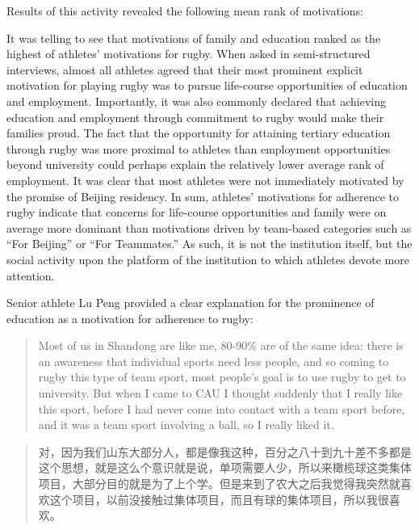 \begin{CJK}{UTF8}{gbsn}
Results of this activity revealed the following mean rank of motivations:

  


It was telling to see that motivations of family and education ranked as the highest of athletes' motivations for rugby.  When asked in semi-structured interviews, almost all athletes agreed that their most prominent explicit motivation for playing rugby was to pursue life-course opportunities of education and employment.  Importantly, it was also commonly declared that achieving education and employment through commitment to rugby would make their families proud.  The fact that the opportunity for attaining tertiary education through rugby was more proximal to athletes than employment opportunities beyond university could perhaps explain the relatively lower average rank of employment. It was clear that most athletes were not immediately motivated by the promise of Beijing residency.  In sum, athletes' motivations for adherence to rugby indicate that concerns for life-course opportunities and family were on average more dominant than motivations driven by team-based categories such as ``For Beijing'' or ``For Teammates.''  As such, it is not the institution itself, but the social activity upon the platform of the institution to which athletes devote more attention.

Senior athlete Lu Peng provided a clear explanation for the prominence of education as a motivation for adherence to rugby:

\begin{quotation}
  Most of us in Shandong are like me, 80-90\% are of the same idea: there is an awareness that individual sports need less people, and so coming to rugby this type of team sport, most people’s goal is to use rugby to get to university.  But when I came to CAU I thought suddenly that I really like this sport, before I had never come into contact with a team sport before, and it was a team sport involving a ball, so I really liked it.
\end{quotation}

\begin{quotation}
  对，因为我们山东大部分人，都是像我这种，百分之八十到九十差不多都是这个思想，就是这么个意识就是说，单项需要人少，所以来橄榄球这类集体项目，大部分目的就是为了上个学。但是来到了农大之后我觉得我突然就喜欢这个项目，以前没接触过集体项目，而且有球的集体项目，所以我很喜欢。
\end{quotation}


\end{CJK}
